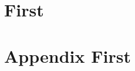 \documentclass{ctexbook}
\begin{document}
\tableofcontents
\chapter{First}
\appendix
{}
\chapter{Appendix First}
\end{document}

